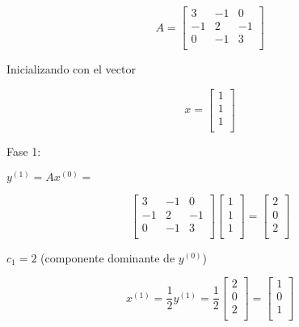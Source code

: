 \[
  A =
  \left[ {\begin{array}{ccc}
   3 & -1 & 0 \\
   -1 & 2 & -1 \\
   0 & -1 & 3 \\
  \end{array} } \right]
\]

Inicializando con el vector 

\[
  x =
  \left[ {\begin{array}{c}
   1  \\
   1 \\
   1  \\
  \end{array} } \right]
\]

Fase 1: 

\begin{center} 
$y^{(1)} = Ax^{(0)} =$
\end{center}
\[
  \left[ {\begin{array}{ccc}
   3 & -1 & 0 \\
   -1 & 2 & -1 \\
   0 & -1 & 3 \\
  \end{array} } \right]
  \left[ {\begin{array}{c}
   1  \\
   1 \\
   1  \\
  \end{array} } \right]
  = 
    \left[ {\begin{array}{c}
   2  \\
   0 \\
   2  \\
  \end{array} } \right]
\]
\begin{center} 
$c_1 = 2$ (componente dominante de $ y^{(0)}$)


\[
x^{(1)} = \frac{1}{2}y^{(1)} = \frac{1}{2} 
  \left[ {\begin{array}{c}
   2  \\
   0 \\
   2 \\
  \end{array} } \right]
  =
  \left[ {\begin{array}{c}
   1  \\
   0 \\
   1 \\
  \end{array} } \right]
\]

\end{center}


